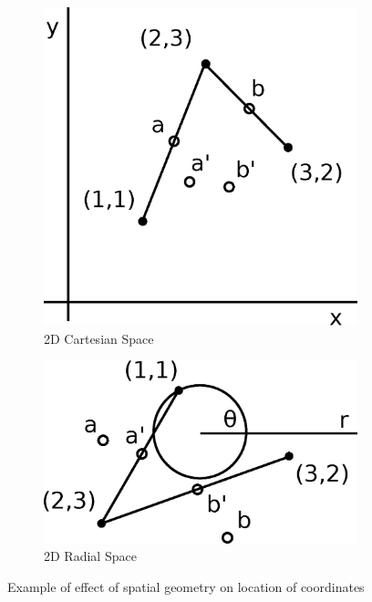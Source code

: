 \begin{figure}
  \centering
  \begin{subfigure}[H]{0.45\linewidth}
    \def\svgwidth{\linewidth}
    \includegraphics[width=\linewidth]{fig/interpolation-cartesian.eps}
    \caption{2D Cartesian Space}
  \end{subfigure}
  \begin{subfigure}[H]{0.45\linewidth}
    \def\svgwidth{\linewidth}
    \includegraphics[width=\linewidth]{fig/interpolation-radial.eps}
    \caption{2D Radial Space}
  \end{subfigure}
  \caption{Example of effect of spatial geometry on location of coordinates}
  \label{figure:cartesian-radial}
\end{figure}
